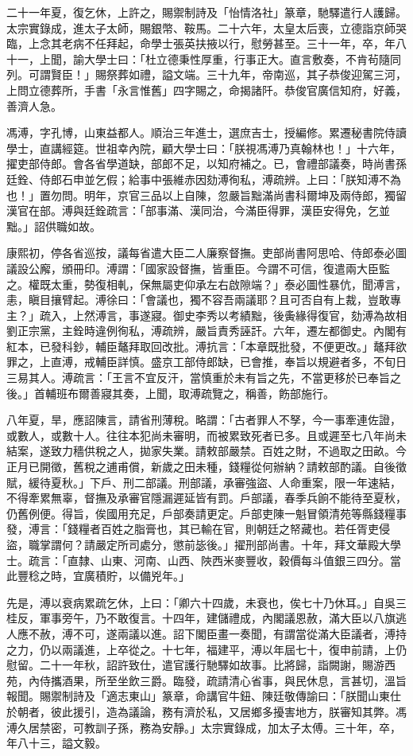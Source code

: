 \begin{pinyinscope}
二十一年夏，復乞休，上許之，賜禦制詩及「怡情洛社」篆章，馳驛遣行人護歸。太宗實錄成，進太子太師，賜銀幣、鞍馬。二十六年，太皇太后喪，立德詣京師哭臨，上念其老病不任拜起，命學士張英扶掖以行，慰勞甚至。三十一年，卒，年八十一，上聞，諭大學士曰：「杜立德秉性厚重，行事正大。直言敷奏，不肯茍隨同列。可謂賢臣！」賜祭葬如禮，謚文端。三十九年，帝南巡，其子恭俊迎駕三河，上問立德葬所，手書「永言惟舊」四字賜之，命揭諸阡。恭俊官廣信知府，好義，善濟人急。

馮溥，字孔博，山東益都人。順治三年進士，選庶吉士，授編修。累遷秘書院侍讀學士，直講經筵。世祖幸內院，顧大學士曰：「朕視馮溥乃真翰林也！」十六年，擢吏部侍郎。會各省學道缺，部郎不足，以知府補之。已，會禮部議奏，時尚書孫廷銓、侍郎石申並乞假；給事中張維赤因劾溥徇私，溥疏辨。上曰：「朕知溥不為也！」置勿問。明年，京官三品以上自陳，忽嚴旨黜滿尚書科爾坤及兩侍郎，獨留漢官在部。溥與廷銓疏言：「部事滿、漢同治，今滿臣得罪，漢臣安得免，乞並黜。」詔供職如故。

康熙初，停各省巡按，議每省遣大臣二人廉察督撫。吏部尚書阿思哈、侍郎泰必圖議設公廨，頒冊印。溥謂：「國家設督撫，皆重臣。今謂不可信，復遣兩大臣監之。權既太重，勢復相軋，保無屬吏仰承左右啟隙端？」泰必圖性暴伉，聞溥言，恚，瞋目攘臂起。溥徐曰：「會議也，獨不容吾兩議耶？且可否自有上裁，豈敢專主？」疏入，上然溥言，事遂寢。御史李秀以考績黜，後夤緣得復官，劾溥為故相劉正宗黨，主銓時違例徇私，溥疏辨，嚴旨責秀誣訐。六年，遷左都御史。內閣有紅本，已發科鈔，輔臣鼇拜取回改批。溥抗言：「本章既批發，不便更改。」鼇拜欲罪之，上直溥，戒輔臣詳慎。盛京工部侍郎缺，已會推，奉旨以規避者多，不旬日三易其人。溥疏言：「王言不宜反汗，當慎重於未有旨之先，不當更移於已奉旨之後。」首輔班布爾善寢其奏，上聞，取溥疏覽之，稱善，飭部施行。

八年夏，旱，應詔陳言，請省刑薄稅。略謂：「古者罪人不孥，今一事牽連佐證，或數人，或數十人。往往本犯尚未審明，而被累致死者已多。且或遲至七八年尚未結案，遂致力穡供稅之人，拋家失業。請敕部嚴禁。百姓之財，不過取之田畝。今正月已開徵，舊稅之逋甫償，新歲之田未種，錢糧從何辦納？請敕部酌議。自後徵賦，緩待夏秋。」下戶、刑二部議。刑部議，承審強盜、人命重案，限一年速結，不得牽累無辜，督撫及承審官隱漏遲延皆有罰。戶部議，春季兵餉不能待至夏秋，仍舊例便。得旨，俟國用充足，戶部奏請更定。戶部吏陳一魁冒領清苑等縣錢糧事發，溥言：「錢糧者百姓之脂膏也，其已輸在官，則朝廷之帑藏也。若任胥吏侵盜，職掌謂何？請嚴定所司處分，懲前毖後。」擢刑部尚書。十年，拜文華殿大學士。疏言：「直隸、山東、河南、山西、陜西米麥豐收，穀價每斗值銀三四分。當此豐稔之時，宜廣積貯，以備兇年。」

先是，溥以衰病累疏乞休，上曰：「卿六十四歲，未衰也，俟七十乃休耳。」自吳三桂反，軍事旁午，乃不敢復言。十四年，建儲禮成，內閣議恩赦，滿大臣以八旗逃人應不赦，溥不可，遂兩議以進。詔下閣臣畫一奏聞，有謂當從滿大臣議者，溥持之力，仍以兩議進，上卒從之。十七年，福建平，溥以年屆七十，復申前請，上仍慰留。二十一年秋，詔許致仕，遣官護行馳驛如故事。比將歸，詣闕謝，賜游西苑，內侍攜酒果，所至坐飲三爵。臨發，疏請清心省事，與民休息，言甚切，溫旨報聞。賜禦制詩及「適志東山」篆章，命講官牛鈕、陳廷敬傳諭曰：「朕聞山東仕於朝者，彼此援引，造為議論，務有濟於私，又居鄉多擾害地方，朕審知其弊。馮溥久居禁密，可教訓子孫，務為安靜。」太宗實錄成，加太子太傅。三十年，卒，年八十三，謚文毅。


\end{pinyinscope}
